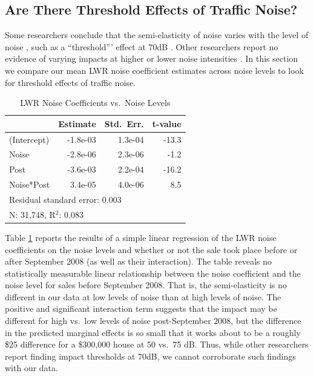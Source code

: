 \documentclass{article}\usepackage{graphicx, color}
\begin{document}
\subsection{Are There Threshold Effects of Traffic Noise?}

Some researchers conclude that the semi-elasticity of noise varies with the level of noise \citep{Andersson2010, MarmolejoDuarteCarlos;GonzalezTamez2009, Theebe2004a, Miedema2001, Wilhelmsson2000}, such as a ``threshold''' effect at 70dB \citep{Wilhelmsson2000, Cohen2009}. Other researchers report no evidence of varying impacts at higher or lower noise intensities \citep{Blanco2011, Baranzini2010, Kim2007, Huang;Palmquist2001}. In this section we compare our mean LWR noise coefficient estimates across noise levels to look for threshold effects of traffic noise.

\begin{table}
\begin{center}
\caption{LWR Noise Coefficients vs.\ Noise Levels}\label{tab:LWRnonlinear}
\begin{tabular}{lrrr}
         &   Estimate & Std.\ Err. & t-value \\ \hline
(Intercept) & -1.8e-03 & 1.3e-04  &-13.3 \\
Noise       & -2.8e-06 & 2.3e-06  & -1.2 \\  
Post        & -3.6e-03 & 2.2e-04  &-16.2 \\
Noise*Post  &  3.4e-05 & 4.0e-06  &  8.5 \\ \hline
\multicolumn{4}{l}{Residual standard error: 0.003} \\
\multicolumn{4}{l}{N: 31,748, R$^2$: 0.083} \\
\end{tabular}
\end{center}
\end{table}

Table \ref{tab:LWRnonlinear} reports the results of a simple linear regression of the LWR noise coefficients on the noise levels and whether or not the sale took place before or after September 2008 (as well as their interaction). The table reveals no statistically measurable linear relationship between the noise coefficient and the noise level for sales before September 2008. That is, the semi-elasticity is no different in our data at low levels of noise than at high levels of noise. The positive and significant interaction term suggests that the impact may be different for high vs.\ low levels of noise post-September 2008, but the difference in the predicted marginal effects is so small that it works about to be a roughly \$25 difference for a \$300,000 house at 50 vs.\ 75 dB. Thus, while other researchers report finding impact thresholds at 70dB, we cannot corroborate such findings with our data.
\end{document}
